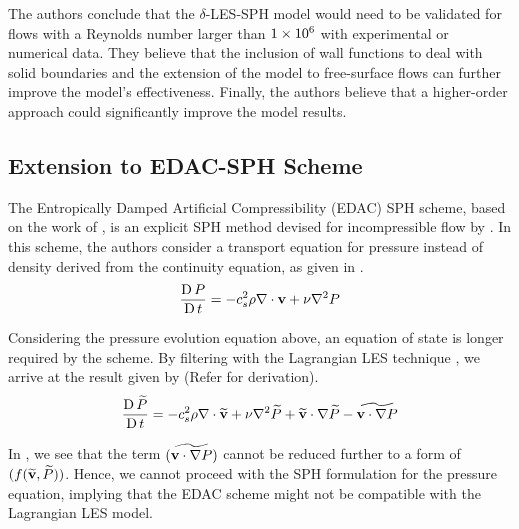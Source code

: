 The authors conclude that the $\delta$-LES-SPH model would need to be validated for flows with a Reynolds number larger than $1 \times {10}^{6}$ with experimental or numerical data. They believe that the inclusion of wall functions to deal with solid boundaries and the extension of the model to free-surface flows can further improve the model’s effectiveness. Finally, the authors believe that a higher-order approach could significantly improve the model results.

\subsection{Extension to EDAC-SPH Scheme}
\label{sec:Extension-to-EDAC-SPH-Scheme}
The Entropically Damped Artificial Compressibility (EDAC) SPH scheme, based on the work of \cite{Clausen2013}, is an explicit SPH method devised for incompressible flow by \cite{Ramachandran2019}.
In this scheme, the authors consider a transport equation for pressure instead of density derived from the continuity equation, as given in .
\begin{equation}
    \frac{\operatorname{D} P}{\operatorname{D} t} = -c_s^2 \rho \nabla \cdot \mathbf{v} + \nu \nabla^2 P
    \label{eq:Ramachandran2019-edac-p-transport}
\end{equation}

Considering the pressure evolution equation above, an equation of state is longer required by the scheme.
By filtering  with the Lagrangian LES technique \parencite{DiMascio2017}, we arrive at the result given by  (Refer  for derivation).
\begin{equation}
    \frac{\operatorname{D} \widetilde{P}}{\operatorname{D} t} = -c_s^2 \rho \nabla \cdot \widetilde{\mathbf{v}} + \nu \nabla^2 \widetilde{P} + \widetilde{\mathbf{v}} \cdot \nabla \widetilde{P} - \widetilde{\mathbf{v}\cdot\nabla P}
    \label{eq:edac-filtered}
\end{equation}

In , we see that the term $(\widetilde{\mathbf{v}\cdot\nabla P})$ cannot be reduced further to a form of $(f(\widetilde{\mathbf{v}}, \widetilde{P}))$. Hence, we cannot proceed with the SPH formulation for the pressure equation, implying that the EDAC scheme might not be compatible with the Lagrangian LES model.

